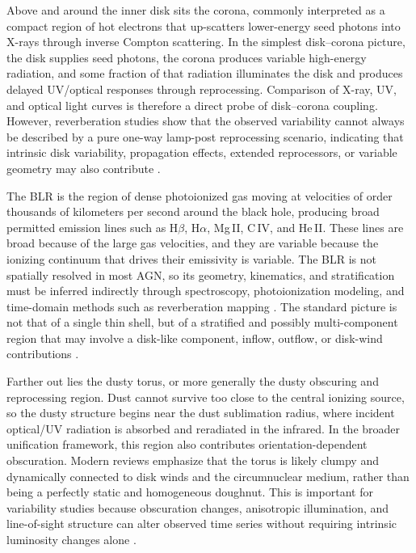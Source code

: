 \documentclass{article}
\begin{document}
Above and around the inner disk sits the corona, commonly interpreted as a compact region of hot electrons that up-scatters lower-energy seed photons into X-rays through inverse Compton scattering. In the simplest disk--corona picture, the disk supplies seed photons, the corona produces variable high-energy radiation, and some fraction of that radiation illuminates the disk and produces delayed UV/optical responses through reprocessing. Comparison of X-ray, UV, and optical light curves is therefore a direct probe of disk--corona coupling. However, reverberation studies show that the observed variability cannot always be described by a pure one-way lamp-post reprocessing scenario, indicating that intrinsic disk variability, propagation effects, extended reprocessors, or variable geometry may also contribute \cite{Cackett2021,Fausnaugh2017}.

The BLR is the region of dense photoionized gas moving at velocities of order thousands of kilometers per second around the black hole, producing broad permitted emission lines such as H$\beta$, H$\alpha$, Mg\,II, C\,IV, and He\,II. These lines are broad because of the large gas velocities, and they are variable because the ionizing continuum that drives their emissivity is variable. The BLR is not spatially resolved in most AGN, so its geometry, kinematics, and stratification must be inferred indirectly through spectroscopy, photoionization modeling, and time-domain methods such as reverberation mapping \cite{Peterson2006,Cackett2021}. The standard picture is not that of a single thin shell, but of a stratified and possibly multi-component region that may involve a disk-like component, inflow, outflow, or disk-wind contributions \cite{Peterson2006,Netzer2015}.

Farther out lies the dusty torus, or more generally the dusty obscuring and reprocessing region. Dust cannot survive too close to the central ionizing source, so the dusty structure begins near the dust sublimation radius, where incident optical/UV radiation is absorbed and reradiated in the infrared. In the broader unification framework, this region also contributes orientation-dependent obscuration. Modern reviews emphasize that the torus is likely clumpy and dynamically connected to disk winds and the circumnuclear medium, rather than being a perfectly static and homogeneous doughnut. This is important for variability studies because obscuration changes, anisotropic illumination, and line-of-sight structure can alter observed time series without requiring intrinsic luminosity changes alone \cite{Netzer2015,Cackett2021}.
\end{document}
